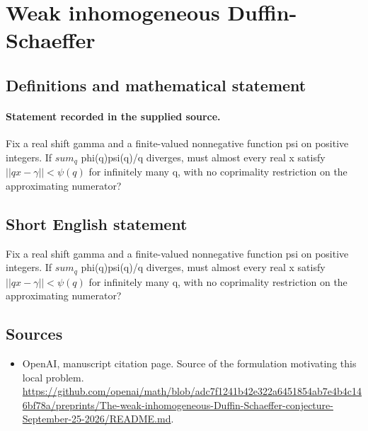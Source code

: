 \documentclass[11pt]{article}
\begin{document}
\section*{Weak inhomogeneous Duffin-Schaeffer}\label{statement}
\subsection{Definitions and mathematical statement}
\paragraph{Statement recorded in the supplied source.}
Fix a real shift gamma and a finite-valued nonnegative function psi on positive integers. If $sum_q$ phi(q)psi(q)/q diverges, must almost every real x satisfy $||qx-\gamma ||<\psi (q)$ for infinitely many q, with no coprimality restriction on the approximating numerator?
\subsection{Short English statement}
Fix a real shift gamma and a finite-valued nonnegative function psi on positive integers. If $sum_q$ phi(q)psi(q)/q diverges, must almost every real x satisfy $||qx-\gamma ||<\psi (q)$ for infinitely many q, with no coprimality restriction on the approximating numerator?
\subsection{Sources}
\begin{itemize}
\item[S1] OpenAI, manuscript citation page. Source of the formulation motivating this local problem.
\url{https://github.com/openai/math/blob/adc7f1241b42e322a6451854ab7e4b4c146bf78a/preprints/The-weak-inhomogeneous-Duffin-Schaeffer-conjecture-September-25-2026/README.md}.
\end{itemize}
\end{document}
